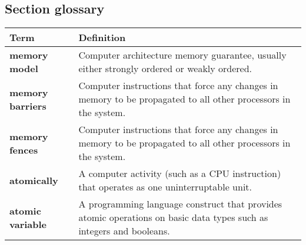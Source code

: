 \subsection{Section glossary}
\centering
\begin{tabular}{>{\raggedright}p{} >{\raggedright\arraybackslash}p{}}
  \toprule
  \textbf{Term}            & \textbf{Definition}                                                                                                 \\
  \midrule
  \textbf{memory model}    & Computer architecture memory guarantee, usually either strongly ordered or weakly ordered.                          \\
  \textbf{memory barriers} & Computer instructions that force any changes in memory to be propagated to all other processors in the system.      \\
  \textbf{memory fences}   & Computer instructions that force any changes in memory to be propagated to all other processors in the system.      \\
  \textbf{atomically}      & A computer activity (such as a CPU instruction) that operates as one uninterruptable unit.                          \\
  \textbf{atomic variable} & A programming language construct that provides atomic operations on basic data types such as integers and booleans. \\
  \bottomrule
\end{tabular}
\vspace{\baselineskip}
